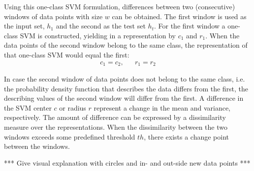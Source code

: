 Using this one-class SVM formulation, differences between two (consecutive) windows of data points with size $w$ can be obtained.
The first window is used as the input set, $h_1$ and the second as the test set $h_t$.
For the first window a one-class SVM is constructed, yielding in a representation by $c_1$ and $r_1$.
When the data points of the second window belong to the same class, the representation of that one-class SVM would equal the first:
\begin{equation}
\begin{aligned}
  c_1 = c_2, & &  r_1 = r_2
\end{aligned}
\end{equation}

In case the second window of data points does not belong to the same class, i.e. the probability density function that describes the data differs from the first, the describing values of the second window will differ from the first.
A difference in the SVM center $c$ or radius $r$ represent a change in the mean and variance, respectively.
The amount of difference can be expressed by a dissimilarity measure over the representations.
When the dissimilarity between the two windows exceeds some predefined threshold $th$, there exists a change point between the windows.

*** Give visual explanation with circles and in- and out-side new data points ***